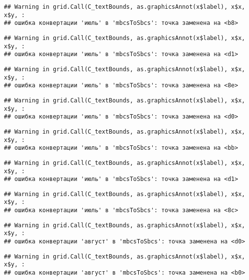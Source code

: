 \documentclass[
]{article}
\begin{document}
\begin{verbatim}
## Warning in grid.Call(C_textBounds, as.graphicsAnnot(x$label), x$x, x$y, :
## ошибка конвертации 'июль' в 'mbcsToSbcs': точка заменена на <b8>
\end{verbatim}

\begin{verbatim}
## Warning in grid.Call(C_textBounds, as.graphicsAnnot(x$label), x$x, x$y, :
## ошибка конвертации 'июль' в 'mbcsToSbcs': точка заменена на <d1>
\end{verbatim}

\begin{verbatim}
## Warning in grid.Call(C_textBounds, as.graphicsAnnot(x$label), x$x, x$y, :
## ошибка конвертации 'июль' в 'mbcsToSbcs': точка заменена на <8e>
\end{verbatim}

\begin{verbatim}
## Warning in grid.Call(C_textBounds, as.graphicsAnnot(x$label), x$x, x$y, :
## ошибка конвертации 'июль' в 'mbcsToSbcs': точка заменена на <d0>
\end{verbatim}

\begin{verbatim}
## Warning in grid.Call(C_textBounds, as.graphicsAnnot(x$label), x$x, x$y, :
## ошибка конвертации 'июль' в 'mbcsToSbcs': точка заменена на <bb>
\end{verbatim}

\begin{verbatim}
## Warning in grid.Call(C_textBounds, as.graphicsAnnot(x$label), x$x, x$y, :
## ошибка конвертации 'июль' в 'mbcsToSbcs': точка заменена на <d1>
\end{verbatim}

\begin{verbatim}
## Warning in grid.Call(C_textBounds, as.graphicsAnnot(x$label), x$x, x$y, :
## ошибка конвертации 'июль' в 'mbcsToSbcs': точка заменена на <8c>
\end{verbatim}

\begin{verbatim}
## Warning in grid.Call(C_textBounds, as.graphicsAnnot(x$label), x$x, x$y, :
## ошибка конвертации 'август' в 'mbcsToSbcs': точка заменена на <d0>
\end{verbatim}

\begin{verbatim}
## Warning in grid.Call(C_textBounds, as.graphicsAnnot(x$label), x$x, x$y, :
## ошибка конвертации 'август' в 'mbcsToSbcs': точка заменена на <b0>
\end{verbatim}
\end{document}
